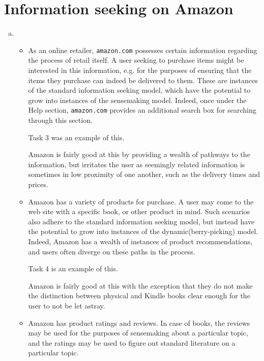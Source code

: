 
\section{Information seeking on Amazon}

\begin{enumerate}[a.]

\item

\begin{itemize}

\item As an online retailer, \texttt{amazon.com} possesses certain information
regarding the process of retail itself. A user seeking to purchase items might
be interested in this information, e.g. for the purposes of ensuring that the
items they purchase can indeed be delivered to them. These are instances of the
standard information seeking model, which have the potential to grow into
instances of the sensemaking model. Indeed, once under the Help section,
\texttt{amazon.com} provides an additional search box for searching through
this section.

Task 3 was an example of this.

Amazon is fairly good at this by providing a wealth of pathways to the
information, but irritates the user as seemingly related information is
sometimes in low proximity of one another, such as the delivery times and
prices.

\item Amazon has a variety of products for purchase. A user may come to the web
site with a specific book, or other product in mind. Such scenarios also adhere
to the standard information seeking model, but instead have the potential to
grow into instances of the dynamic(berry-picking) model. Indeed, Amazon has a
wealth of instances of product recommendations, and users often diverge on
these paths in the process.

Task 4 is an example of this.

Amazon is fairly good at this with the exception that they do not make the
distinction between physical and Kindle books clear enough for the user to not
be let astray.

\item Amazon has product ratings and reviews. In case of books, the reviews may
be used for the purposes of sensemaking about a particular topic, and the
ratings may be used to figure out standard literature on a particular topic.


\end{itemize}
\end{enumerate}
